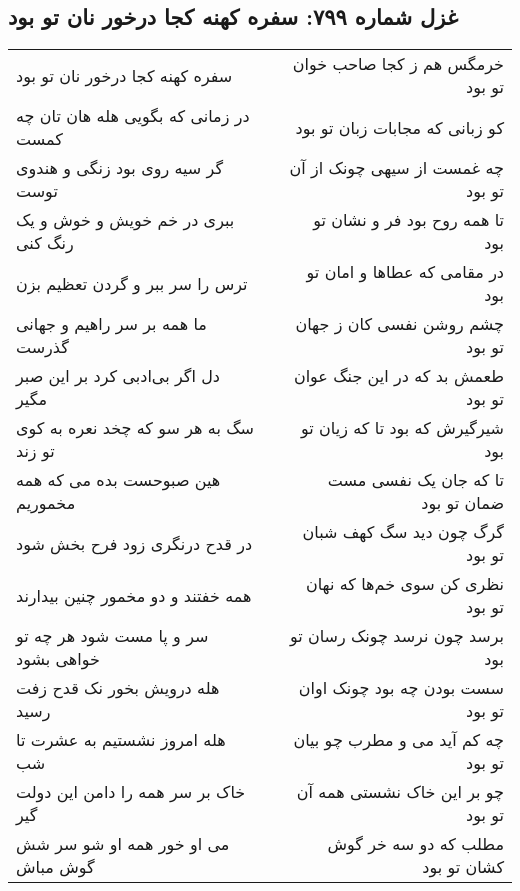 \begin{center}
\section*{غزل شماره ۷۹۹: سفره کهنه کجا درخور نان تو بود}
\label{sec:0799}
\begin{longtable}{l p{0.5cm} r}
سفره کهنه کجا درخور نان تو بود
&&
خرمگس هم ز کجا صاحب خوان تو بود
\\
در زمانی که بگویی هله هان تان چه کمست
&&
کو زبانی که مجابات زبان تو بود
\\
گر سیه روی بود زنگی و هندوی توست
&&
چه غمست از سیهی چونک از آن تو بود
\\
ببری در خم خویش و خوش و یک رنگ کنی
&&
تا همه روح بود فر و نشان تو بود
\\
ترس را سر ببر و گردن تعظیم بزن
&&
در مقامی که عطاها و امان تو بود
\\
ما همه بر سر راهیم و جهانی گذرست
&&
چشم روشن نفسی کان ز جهان تو بود
\\
دل اگر بی‌ادبی کرد بر این صبر مگیر
&&
طعمش بد که در این جنگ عوان تو بود
\\
سگ به هر سو که چخد نعره به کوی تو زند
&&
شیرگیرش که بود تا که زیان تو بود
\\
هین صبوحست بده می که همه مخموریم
&&
تا که جان یک نفسی مست ضمان تو بود
\\
در قدح درنگری زود فرح بخش شود
&&
گرگ چون دید سگ کهف شبان تو بود
\\
همه خفتند و دو مخمور چنین بیدارند
&&
نظری کن سوی خم‌ها که نهان تو بود
\\
سر و پا مست شود هر چه تو خواهی بشود
&&
برسد چون نرسد چونک رسان تو بود
\\
هله درویش بخور نک قدح زفت رسید
&&
سست بودن چه بود چونک اوان تو بود
\\
هله امروز نشستیم به عشرت تا شب
&&
چه کم آید می و مطرب چو بیان تو بود
\\
خاک بر سر همه را دامن این دولت گیر
&&
چو بر این خاک نشستی همه آن تو بود
\\
می او خور همه او شو سر شش گوش مباش
&&
مطلب که دو سه خر گوش کشان تو بود
\\
\end{longtable}
\end{center}

